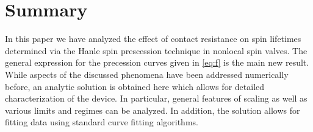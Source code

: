 \section{Summary}
\label{s:summary}

In this paper we have analyzed the effect of contact resistance
on spin lifetimes determined via the Hanle spin prescession technique
in nonlocal spin valves.
The general expression for the precession curves given
in \cref{eq:f} is the main new result.
While aspects of the discussed phenomena have been addressed numerically before,
an analytic solution is obtained here
which allows for detailed characterization of the device.
In particular, general features of scaling
as well as various limits and regimes can be analyzed.
In addition, the solution allows for fitting data
using standard curve fitting algorithms.
